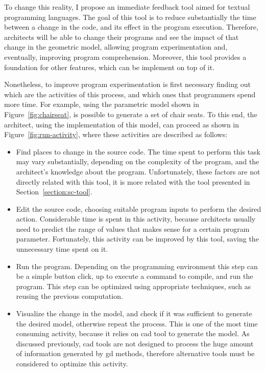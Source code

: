 To change this reality, I propose an immediate feedback tool aimed for textual programming languages. The goal of this tool is to reduce substantially the time between a change in the code, and its effect in the program execution. Therefore, architects will be able to change their programs and see the impact of that change in the geometric model, allowing program experimentation and, eventually, improving program comprehension. Moreover, this tool provides a foundation for other features, which can be implement on top of it.

Nonetheless, to improve program experimentation is first necessary finding out which are the activities of this process, and which ones that programmers spend more time. For example, using the parametric model shown in Figure~\ref{fig:chairseat}, is possible to generate a set of chair seats. To this end, the architect, using the implementation of this model, can proceed as shown in Figure~\ref{fig:run-activity}, where these activities are described as follows:

\begin{itemize}
\item Find places to change in the source code. The time spent to perform this task may vary substantially, depending on the complexity of the program, and the architect's knowledge about the program. Unfortunately, these factors are not directly related with this tool, it is more related with the tool presented in Section~\ref{section:sc-tool}.

\item Edit the source code, choosing suitable program inputs to perform the desired action. Considerable time is spent in this activity, because architects usually need to predict the range of values that makes sense for a certain program parameter. Fortunately, this activity can be improved by this tool, saving the unnecessary time spent on it.

\item Run the program. Depending on the programming environment this step can be a simple button click, up to execute a command to compile, and run the program. This step can be optimized using appropriate techniques, such as reusing the previous computation.

\item Visualize the change in the model, and check if it was sufficient to generate the desired model, otherwise repeat the process. This is one of the most time consuming activity, because it relies on \gls{cad} tool to generate the model. As discussed previously, \gls{cad} tools are not designed to process the huge amount of information generated by \gls{gd} methods, therefore alternative tools must be considered to optimize this activity.   
\end{itemize}

